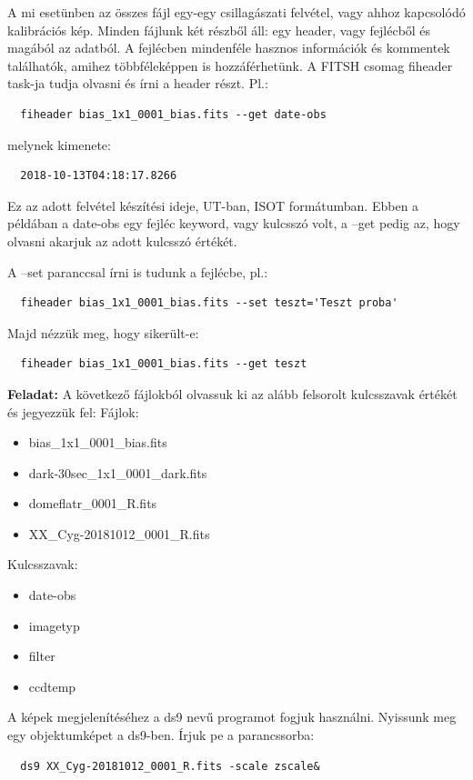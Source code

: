\documentclass{article}
\begin{document}
A mi esetünben az összes fájl egy-egy csillagászati felvétel, vagy ahhoz
kapcsolódó kalibrációs kép.
Minden fájlunk két részből áll: egy header, vagy fejlécből és magából az
adatból. A fejlécben mindenféle hasznos információk és kommentek találhatók,
amihez többféleképpen is hozzáférhetünk.
A FITSH csomag fiheader task-ja tudja olvasni és írni a header részt.
Pl.:

\begin{verbatim}
  fiheader bias_1x1_0001_bias.fits --get date-obs
\end{verbatim}

melynek kimenete:
\begin{verbatim}
  2018-10-13T04:18:17.8266
\end{verbatim}

Ez az adott felvétel készítési ideje, UT-ban, ISOT formátumban.
Ebben a példában a date-obs egy fejléc keyword, vagy kulcsszó volt, a --get
pedig az, hogy olvasni akarjuk az adott kulcsszó értékét.

A --set paranccsal írni is tudunk a fejlécbe, pl.:
\begin{verbatim}
  fiheader bias_1x1_0001_bias.fits --set teszt='Teszt proba'
\end{verbatim}

Majd nézzük meg, hogy sikerült-e:
\begin{verbatim}
  fiheader bias_1x1_0001_bias.fits --get teszt
\end{verbatim}

{\bf Feladat:}
A következő fájlokból olvassuk ki az alább felsorolt kulcsszavak értékét és
jegyezzük fel:
Fájlok:
\begin{itemize}
  \item bias\_1x1\_0001\_bias.fits
  \item dark-30sec\_1x1\_0001\_dark.fits
  \item domeflatr\_0001\_R.fits
  \item XX\_Cyg-20181012\_0001\_R.fits
\end{itemize}
Kulcsszavak:
\begin{itemize}
  \item date-obs
  \item imagetyp
  \item filter
  \item ccdtemp
\end{itemize}


A képek megjelenítéséhez a ds9 nevű programot fogjuk használni.
Nyissunk meg egy objektumképet a ds9-ben. Írjuk pe a parancssorba:
\begin{verbatim}
  ds9 XX_Cyg-20181012_0001_R.fits -scale zscale&
\end{verbatim}
\end{document}

